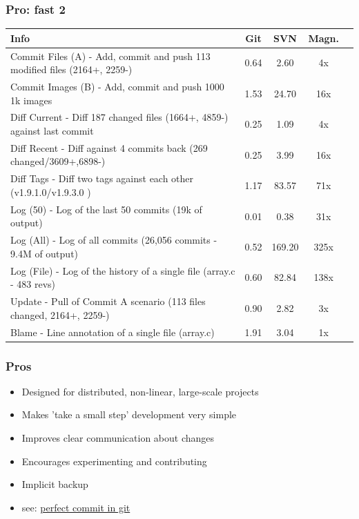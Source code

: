 \documentclass{beamer}
\begin{document}
		\begin{frame}
			\frametitle{Pro: fast 2}
			\begin{center}
				\small
				\begin{tabular}{ l  c  c  c c }
				    \hline
				     Info & Git  & SVN & Magn. \\ \hline
\tiny Commit Files (A) - Add, commit and push 113 modified files (2164+, 2259-) &  0.64 &  2.60 & 4x \\ \hline
\tiny Commit Images (B) - Add, commit and push 1000 1k images &  1.53 & 24.70 & 16x \\ \hline
\tiny Diff Current - Diff 187 changed files (1664+, 4859-) against last commit &  0.25 &  1.09 & 4x \\ \hline
\tiny Diff Recent - Diff against 4 commits back (269 changed/3609+,6898-) &  0.25 &  3.99 & 16x \\ \hline
\tiny Diff Tags - Diff two tags against each other (v1.9.1.0/v1.9.3.0 ) &  1.17 & 83.57 & 71x \\ \hline
\tiny Log (50) - Log of the last 50 commits (19k of output) &  0.01 &  0.38 & 31x \\ \hline
\tiny Log (All) - Log of all commits (26,056 commits - 9.4M of output) &  0.52 & 169.20 & 325x \\ \hline
\tiny Log (File) - Log of the history of a single file (array.c - 483 revs) &  0.60 & 82.84 & 138x \\ \hline
\tiny Update - Pull of Commit A scenario (113 files changed, 2164+, 2259-) &  0.90 &  2.82 & 3x \\ \hline
\tiny Blame - Line annotation of a single file (array.c) &  1.91 &  3.04 & 1x \\ \hline
				\end{tabular}
			\end{center}
		\end{frame}				

		\begin{frame}
			\frametitle{Pros}
			\begin{center}
			\begin{itemize}
                \item Designed for distributed, non-linear, large-scale projects
                \item Makes 'take a small step' development very simple
                \item Improves clear communication about changes 
                \item Encourages experimenting and contributing
                \item Implicit backup
                \item see: \href{https://github.com/git/git/commit/1ca41a19323d455cf0028001677f3adfae0d4cc4}{perfect commit in git}
			\end{itemize}
			\end{center}
		\end{frame}
\end{document}
